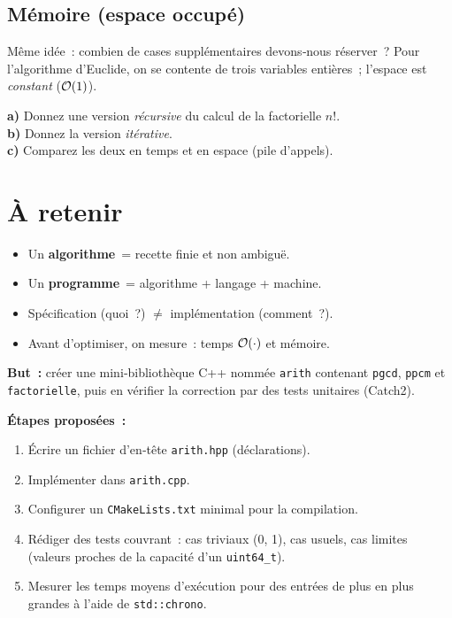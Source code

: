 \subsection{Mémoire (espace occupé)}
Même idée : combien de cases supplémentaires devons‑nous réserver ? Pour
l’algorithme d’Euclide, on se contente de trois variables entières ; l’espace est
\emph{constant} ($\mathcal{O}(1)$).

\begin{exercice}
\textbf{a)} Donnez une version \emph{récursive} du calcul de la factorielle
\(n!\).\\
\textbf{b)} Donnez la version \emph{itérative}.\\
\textbf{c)} Comparez les deux en temps et en espace (pile d’appels).
\end{exercice}

\section*{À retenir}
\begin{itemize}
  \item Un \textbf{algorithme} = recette finie et non ambiguë.
  \item Un \textbf{programme} = algorithme + langage + machine.
  \item Spécification (\og quoi ?\fg) \emph{$\neq$} implémentation (\og comment ?\fg).
  \item Avant d’optimiser, on mesure : temps $\mathcal{O}(\cdot)$ et mémoire.
\end{itemize}

\begin{tp}
\textbf{But :} créer une mini‑bibliothèque C++ nommée \texttt{arith} contenant
\texttt{pgcd}, \texttt{ppcm} et \texttt{factorielle}, puis en vérifier la
correction par des tests unitaires (Catch2).

\textbf{Étapes proposées :}
\begin{enumerate}
  \item Écrire un fichier d’en‑tête \texttt{arith.hpp} (déclarations).
  \item Implémenter dans \texttt{arith.cpp}.
  \item Configurer un \texttt{CMakeLists.txt} minimal pour la compilation.
  \item Rédiger des tests couvrant : cas triviaux (0, 1), cas usuels, cas
        \og limites \fg{} (valeurs proches de la capacité d’un \texttt{uint64\_t}).
  \item Mesurer les temps moyens d’exécution pour des entrées de plus en plus
        grandes à l’aide de \texttt{std::chrono}.
\end{enumerate}
\end{tp}


